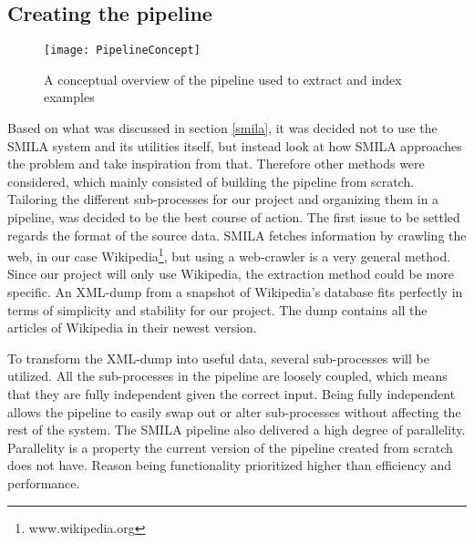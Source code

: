 \subsection{Creating the pipeline} \label{custom-pipeline}


\begin{figure}[h]
\caption{A conceptual overview of the pipeline used to extract and index examples}
\texttt{[image: PipelineConcept]}
\end{figure}



Based on what was discussed in section \ref{smila}, it was decided not to use the SMILA system and its utilities itself, but instead look at how SMILA approaches the problem and take inspiration from that. Therefore other methods were considered, which mainly consisted of building the pipeline from scratch. Tailoring the different sub-processes for our project and organizing them in a pipeline, was decided to be the best course of action. The first issue to be settled regards the format of the source data. SMILA fetches information by crawling the web, in our case Wikipedia\footnote{www.wikipedia.org}, but using a web-crawler is a very general method. Since our project will only use Wikipedia, the extraction method could be more specific. An XML-dump from a snapshot of Wikipedia's database fits perfectly in terms of simplicity and stability for our project. The dump contains all the articles of Wikipedia in their newest version.

To transform the XML-dump into useful data, several sub-processes will be utilized. All the sub-processes in the pipeline are loosely coupled, which means that they are fully independent given the correct input. Being fully independent allows the pipeline to easily swap out or alter sub-processes without affecting the rest of the system. The SMILA pipeline also delivered a high degree of parallelity. Parallelity is a property the current version of the pipeline created from scratch does not have. Reason being functionality prioritized higher than efficiency and performance. 

